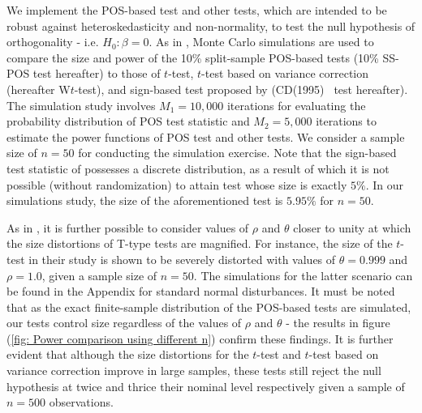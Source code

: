 \documentclass[harvard,11pt]{article}
\begin{document}
We implement the POS-based test and other tests, which are intended to be robust against
heteroskedasticity and non-normality, to test the null hypothesis of orthogonality - i.e. $%
H_{0}:\beta =0.$ As in \citet{dufour2010exact}, Monte Carlo simulations are used to compare the size and
power of the 10\% split-sample POS-based tests (10\% SS-POS test hereafter) to those of $t$-test, $t$-test
based on \citet{white1980heteroskedasticity} variance correction (hereafter W$t$-test), and
sign-based test proposed by 
\citet{dufour1995exact} (CD(1995)%
\textit{\ }test hereafter). The simulation study involves $M_{1}=10,000$ iterations for evaluating the
probability distribution of POS test statistic and $M_{2}=5,000$ iterations
to estimate the power functions of POS test and other tests. We consider a sample size of $n=50$ for conducting the simulation exercise. 
Note that the sign-based test statistic of \citet{dufour1995exact} possesses a discrete distribution, as a result of which it is not possible
(without randomization) to attain test whose size is exactly $5\%.$ In our
simulations study, the size of the aforementioned test is $5.95\%$ for $n=50$.

As in \citet{mankiw1986we}, it is further possible to consider values of $\rho$ and $\theta$ closer to unity at which the size distortions of T-type tests are magnified. For instance, the size of the $t$-test in their study is shown to be severely distorted with values of $\theta=0.999$ and $\rho=1.0$, given a sample size of $n=50$. The simulations for the latter scenario can be found in the Appendix for standard normal disturbances. It must be noted that as the exact finite-sample distribution of the POS-based tests are simulated, our tests control size regardless of the values of $\rho$ and $\theta$ - the results in figure (\ref{fig: Power comparison using different n}) confirm these findings. It is further evident that although the size distortions for the $t$-test and $t$-test based on \citet{white1980heteroskedasticity} variance correction improve in large samples, these tests still reject the null hypothesis at twice and thrice their nominal level respectively given a sample of $n=500$ observations.
\end{document}
